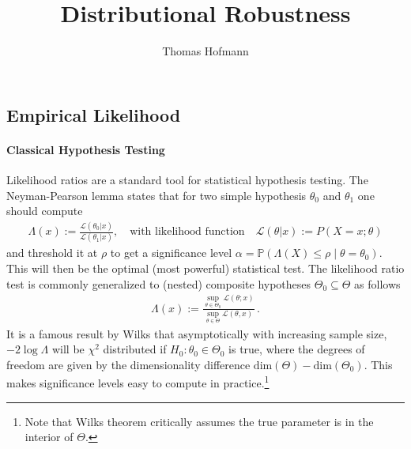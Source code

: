 \documentclass{article}
\title{
	Distributional Robustness  
}
\author{Thomas Hofmann}
\newcommand{\Ell}{{\mathcal L}}
\begin{document}
\maketitle 

\subsection*{Empirical Likelihood}

\paragraph{Classical Hypothesis Testing} 


Likelihood  ratios are a standard tool for statistical hypothesis testing. The Neyman-Pearson lemma \cite{neyman1933problem} states that for two simple hypothesis $\theta_0$ and $\theta_1$ one should compute 
\begin{align}
\Lambda(x) := \frac{\Ell(\theta_0|x)}{\Ell(\theta_1|x)}, \quad \text{with likelihood function} \quad \Ell(\theta|x) := P(X\!=\!x; \theta)
\end{align}
and threshold it at $\rho$ to get a significance level $\alpha = \mathbb P\left( \Lambda(X) \le \rho \mid \theta = \theta_0 \right) $. This will then be the optimal (most powerful) statistical test. The likelihood ratio test is commonly generalized to (nested) composite hypotheses $\Theta_0 \subseteq \Theta$ as follows
\begin{align}
\Lambda(x) := \frac{\sup_{\theta \in \Theta_0} \Ell(\theta; x)}{\sup_{\theta \in \Theta} \Ell(\theta,x)}\,.
\end{align}
It is a famous result by Wilks \cite{wilks1938large} that asymptotically with increasing sample size, $- 2 \log \Lambda$ will be $\chi^2$ distributed if $H_0: \theta_0 \in \Theta_0$ is true, where the degrees of freedom are given by the dimensionality difference $\text{dim}(\Theta)-\text{dim}(\Theta_0)$. This makes significance levels easy to compute in practice.\footnote{Note that Wilks theorem critically assumes the true parameter is in the interior of $\Theta$.}
\end{document}
